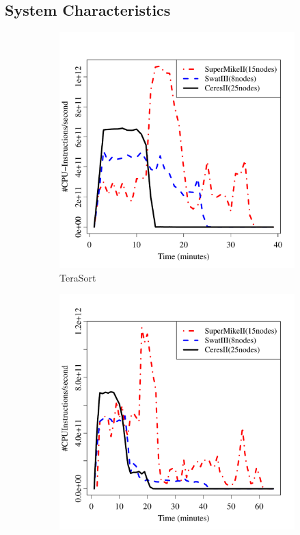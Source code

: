 \documentclass[journal]{IEEEtran}
\begin{document}
\subsection{System Characteristics}
\begin{figure}[htb]
	\begin{subfigure}[b]{0.24\textwidth}
                \includegraphics[width=\textwidth]{Figures/SystemFigures/TeraSortIPS.pdf}
                \caption{TeraSort}
                \label{fig:TeraSortIPS}
    \end{subfigure}
 	\begin{subfigure}[b]{0.24\textwidth}
                \includegraphics[width=\textwidth]{Figures/SystemFigures/WordCountIPS.pdf}

\end{subfigure}
\end{figure}
\end{document}
